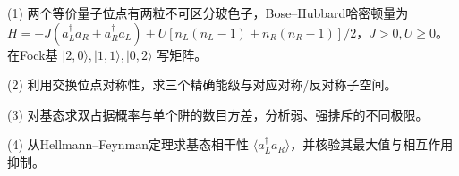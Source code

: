 (1) 两个等价量子位点有两粒不可区分玻色子，Bose–Hubbard哈密顿量为 \(H=-J(a_L^\dagger a_R+a_R^\dagger a_L)+U[n_L(n_L-1)+n_R(n_R-1)]/2\)，\(J>0,U\ge0\)。在Fock基 \(|2,0\rangle,|1,1\rangle,|0,2\rangle\) 写矩阵。

(2) 利用交换位点对称性，求三个精确能级与对应对称/反对称子空间。

(3) 对基态求双占据概率与单个阱的数目方差，分析弱、强排斥的不同极限。

(4) 从Hellmann–Feynman定理求基态相干性 \(\langle a_L^\dagger a_R\rangle\)，并核验其最大值与相互作用抑制。
